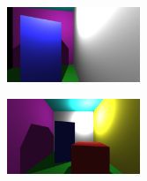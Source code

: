 \documentclass[a4paper]{article}
\begin{document}
\begin{figure}[H]
    \centering
    \begin{minipage}{.5\textwidth}
        \centering
        \includegraphics[width=4cm]{720ani2.png}
        \label{fig:camera}
    \end{minipage}%
    \begin{minipage}{.5\textwidth}
        \centering
        \includegraphics[width=4cm]{light2.png}
        \label{fig:light}
    \end{minipage}
\end{figure}
\end{document}
